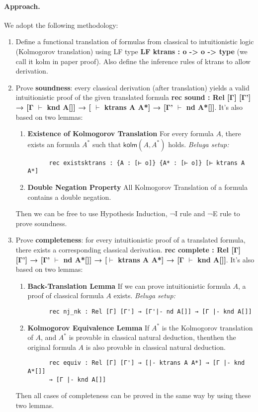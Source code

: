 \documentclass{article}
\begin{document}
\paragraph{Approach.} We adopt the following methodology:
\begin{enumerate}
    \item Define a functional translation of formulas from classical to intuitionistic logic (Kolmogorov translation) using LF type \textbf{LF ktrans : o -> o -> type} (we call it kolm in paper proof). Also define the inference rules of ktrans to allow derivation.
    \item Prove \textbf{soundness}: every classical derivation (after translation) yields a valid intuitionistic proof of the given translated formula \textbf{ rec sound : Rel [Γ] [Γ'] → [Γ $\vdash$ knd A[]] → [ $\vdash$ ktrans A A*] → [Γ' $\vdash$ nd A*[]]}. It's also based on two lemmas:
    \begin{enumerate}
      \item \textbf{Existence of Kolmogorov Translation}  
      For every formula $A$, there exists an formula $A^*$ such that $\textsf{kolm}(A, A^*)$ holds.  
      \textit{Beluga setup:}
      \begin{verbatim}
      rec existsktrans : {A : [⊢ o]} {A* : [⊢ o]} [⊢ ktrans A A*]
      \end{verbatim}
    
      \item \textbf{Double Negation Property}  
      All Kolmogorov Translation of a formula contains a double negation. 
    \end{enumerate}
    Then we can be free to use Hypothesis Induction, ¬I rule and ¬E rule to prove soundness.
    \item Prove \textbf{completeness}: for every intuitionistic proof of a  translated formula, there exists a corresponding classical derivation. \textbf{rec complete :  Rel [Γ] [Γ'] → [Γ' $\vdash$ nd A*[]] → [$\vdash$ ktrans A A*] → [Γ $\vdash$ knd A[]]}. It's also based on two lemmas:
    \begin{enumerate}
      \item \textbf{Back-Translation Lemma}  
      If we can prove intuitionistic formula $A$, a proof of classical formula $A$ exists.  
      \textit{Beluga setup:}
      \begin{verbatim}
      rec nj_nk : Rel [Γ] [Γ'] → [Γ'|- nd A[]] → [Γ |- knd A[]]
      \end{verbatim}
    
      \item \textbf{Kolmogorov Equivalence Lemma}  
      If $A^*$ is the Kolmogorov translation of $A$, and $A^*$ is provable in classical natural deduction, thenthen the original formula $A$ is also provable in classical natural deduction.
      \begin{verbatim}
      rec equiv : Rel [Γ] [Γ'] → [|- ktrans A A*] → [Γ |- knd A*[]] 
      → [Γ |- knd A[]]
      \end{verbatim}
    \end{enumerate}
    Then all cases of completeness can be proved in the same way by using these two lemmas.
\end{enumerate}
\end{document}
